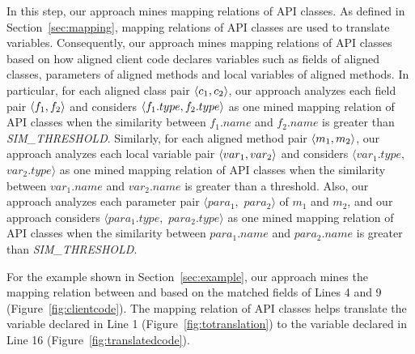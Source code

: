 In this step, our approach mines mapping relations of
API classes. As defined in Section~\ref{sec:mapping}, mapping relations of API classes are used
to translate variables. Consequently, our approach mines mapping
relations of API classes based on how aligned client code declares
variables such as fields of aligned classes, parameters of aligned methods
and local variables of aligned methods. In
particular, for each aligned class pair $\langle c_1, c_2 \rangle$, our
approach analyzes each field pair $\langle f_1, f_2 \rangle$ and considers
$\langle f_1.type, f_2.type \rangle$ as one mined mapping relation of API
classes when the similarity between $f_1.name$ and $f_2.name$ is
greater than \emph{SIM\_THRESHOLD}. Similarly, for each aligned method pair
$\langle m_1, m_2 \rangle$, our approach analyzes each local variable pair
$\langle var_1, var_2 \rangle$ and considers $\langle var_1.type,$ $
var_2.type\rangle$ as one mined mapping relation of API classes when
the similarity between $var_1.name$ and $var_2.name$ is greater than
a threshold. Also, our approach analyzes each parameter pair
$\langle para_1, $ $para_2\rangle$ of $m_1$ and $m_2$, and our
approach considers $\langle para_1.type,$ $para_2.type\rangle$ as
one mined mapping relation of API classes when the similarity
between $para_1.name$ and $para_2.name$ is greater than \emph{SIM\_THRESHOLD}.

For the example shown in Section~\ref{sec:example}, our approach
mines the mapping relation between  and
 based on the matched fields of Lines 4
and 9 (Figure~\ref{fig:clientcode}). The mapping relation of API classes helps translate the
variable declared in Line 1 (Figure~\ref{fig:totranslation})
to the variable declared in Line 16 (Figure~\ref{fig:translatedcode}).


